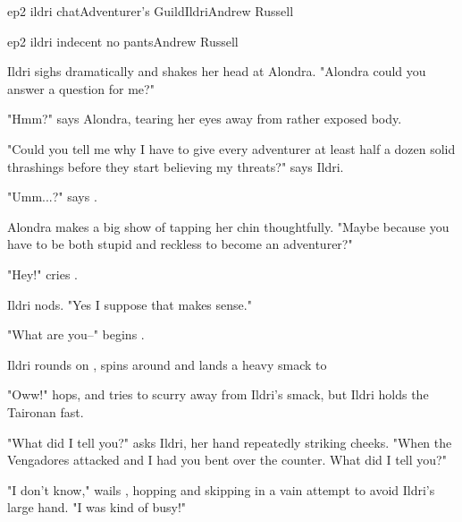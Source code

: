 \documentclass{book}
\begin{document}
\begin{node}{ep2 ildri chat}{Adventurer's Guild}{Ildri}{Andrew Russell}




\end{node}

\begin{childnode}{ep2 ildri indecent no pants}{Andrew Russell}


Ildri sighs dramatically and shakes her head at Alondra. "Alondra could you answer a question for me?"

"Hmm?" says Alondra, tearing her eyes away from \names{} rather exposed body.

"Could you tell me why I have to give every adventurer at least half a dozen solid thrashings before they start believing my threats?" says Ildri.

"Umm...?" says \name{}.

Alondra makes a big show of tapping her chin thoughtfully. "Maybe because you have to be both stupid and reckless to become an adventurer?"

"Hey!" cries \name{}.

Ildri nods. "Yes I suppose that makes sense."

"What are you--" begins \name{}.

Ildri rounds on \name{}, spins \himher{} around and lands a heavy smack to \names{} 

"Oww!" \name{} hops, and tries to scurry away from Ildri's smack, but Ildri holds the Taironan fast.

"What did I tell you?" asks Ildri, her hand repeatedly striking \names{} \quivering{} cheeks. "When the Vengadores attacked and I had you bent over the counter. What did I tell you?"

"I don't know," wails \name{}, hopping and skipping in a vain attempt to avoid Ildri's large hand. "I was kind of busy!"


\end{childnode}
\end{document}
